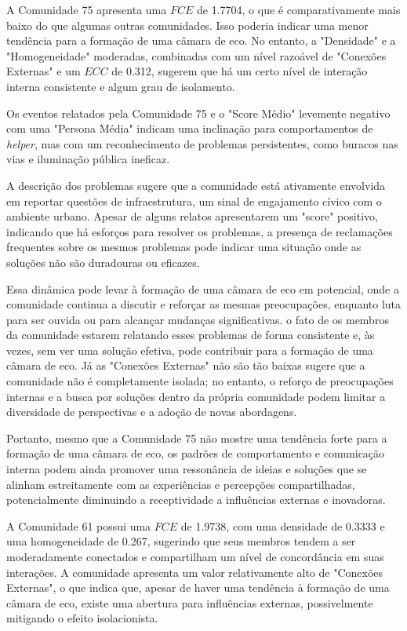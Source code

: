 A Comunidade 75 apresenta uma $FCE$ de 1.7704, o que é comparativamente mais baixo do que algumas outras comunidades. Isso poderia indicar uma menor tendência para a formação de uma câmara de eco. No entanto, a "Densidade" e a "Homogeneidade" moderadas, combinadas com um nível razoável de "Conexões Externas" e um $ECC$ de 0.312, sugerem que há um certo nível de interação interna consistente e algum grau de isolamento.

Os eventos relatados pela Comunidade 75 e o "Score Médio" levemente negativo com uma "Persona Média" indicam uma inclinação para comportamentos de \textit{helper}, mas com um reconhecimento de problemas persistentes, como buracos nas vias e iluminação pública ineficaz.

A descrição dos problemas sugere que a comunidade está ativamente envolvida em reportar questões de infraestrutura, um sinal de engajamento cívico com o ambiente urbano. Apesar de alguns relatos apresentarem um "score" positivo, indicando que há esforços para resolver os problemas, a presença de reclamações frequentes sobre os mesmos problemas pode indicar uma situação onde as soluções não são duradouras ou eficazes.

Essa dinâmica pode levar à formação de uma câmara de eco em potencial, onde a comunidade continua a discutir e reforçar as mesmas preocupações, enquanto luta para ser ouvida ou para alcançar mudanças significativas. o fato de os membros da comunidade estarem relatando esses problemas de forma consistente e, às vezes, sem ver uma solução efetiva, pode contribuir para a formação de uma câmara de eco. Já as "Conexões Externas" não são tão baixas sugere que a comunidade não é completamente isolada; no entanto, o reforço de preocupações internas e a busca por soluções dentro da própria comunidade podem limitar a diversidade de perspectivas e a adoção de novas abordagens.

Portanto, mesmo que a Comunidade 75 não mostre uma tendência forte para a formação de uma câmara de eco, os padrões de comportamento e comunicação interna podem ainda promover uma ressonância de ideias e soluções que se alinham estreitamente com as experiências e percepções compartilhadas, potencialmente diminuindo a receptividade a influências externas e inovadoras.

A Comunidade 61 possui uma $FCE$ de 1.9738, com uma densidade de 0.3333 e uma homogeneidade de 0.267, sugerindo que seus membros tendem a ser moderadamente conectados e compartilham um nível de concordância em suas interações. A comunidade apresenta um valor relativamente alto de "Conexões Externas", o que indica que, apesar de haver uma tendência à formação de uma câmara de eco, existe uma abertura para influências externas, possivelmente mitigando o efeito isolacionista.

